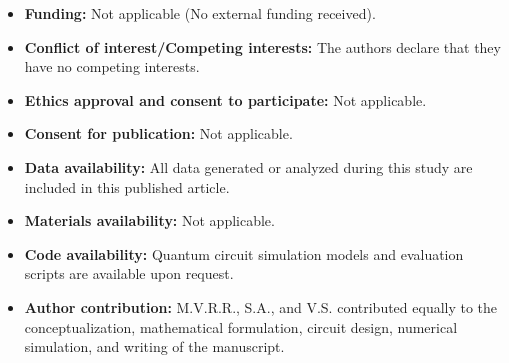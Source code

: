 \documentclass[sn-mathphys,Numbered]{sn-jnl}
\theoremstyle{thmstyleone}
\theoremstyle{thmstyletwo}
\theoremstyle{thmstylethree}
\begin{document}
\begin{itemize}
\item \textbf{Funding:} Not applicable (No external funding received).
\item \textbf{Conflict of interest/Competing interests:} The authors declare that they have no competing interests.
\item \textbf{Ethics approval and consent to participate:} Not applicable.
\item \textbf{Consent for publication:} Not applicable.
\item \textbf{Data availability:} All data generated or analyzed during this study are included in this published article.
\item \textbf{Materials availability:} Not applicable.
\item \textbf{Code availability:} Quantum circuit simulation models and evaluation scripts are available upon request.
\item \textbf{Author contribution:} M.V.R.R., S.A., and V.S. contributed equally to the conceptualization, mathematical formulation, circuit design, numerical simulation, and writing of the manuscript.
\end{itemize}


\end{document}
